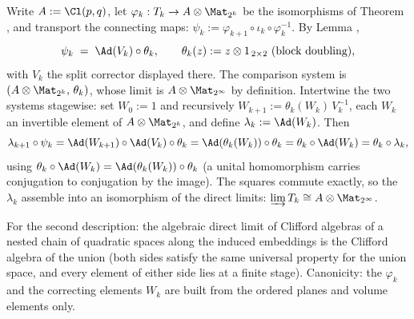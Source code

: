 Write $A := \Cl(p,q)$, let $\varphi_k : T_k \to A \otimes \Mat_{2^k}$ be the isomorphisms of Theorem , and transport the connecting maps: $\psi_k := \varphi_{k+1} \circ \iota_k \circ \varphi_k^{-1}$. By Lemma ,
\[
\psi_k \;=\; \Ad(V_k) \circ \theta_k, \qquad \theta_k(z) := z \otimes 1_{\,2 \times 2}\ \text{(block doubling)},
\]
with $V_k$ the split corrector displayed there. The comparison system is $(A \otimes \Mat_{2^k},\, \theta_k)$, whose limit is $A \otimes \Mat_{2^\infty}$ by definition. Intertwine the two systems stagewise: set $W_0 := 1$ and recursively $W_{k+1} := \theta_k(W_k)\, V_k^{-1}$, each $W_k$ an invertible element of $A \otimes \Mat_{2^k}$, and define $\lambda_k := \Ad(W_k)$. Then
\[
\lambda_{k+1} \circ \psi_k = \Ad(W_{k+1}) \circ \Ad(V_k) \circ \theta_k = \Ad(\theta_k(W_k)) \circ \theta_k = \theta_k \circ \Ad(W_k) = \theta_k \circ \lambda_k ,
\]
using $\theta_k \circ \Ad(W_k) = \Ad(\theta_k(W_k)) \circ \theta_k$ (a unital homomorphism carries conjugation to conjugation by the image). The squares commute exactly, so the $\lambda_k$ assemble into an isomorphism of the direct limits: $\varinjlim T_k \cong A \otimes \Mat_{2^\infty}$.

For the second description: the algebraic direct limit of Clifford algebras of a nested chain of quadratic spaces along the induced embeddings is the Clifford algebra of the union (both sides satisfy the same universal property for the union space, and every element of either side lies at a finite stage). Canonicity: the $\varphi_k$ and the correcting elements $W_k$ are built from the ordered planes and volume elements only.
